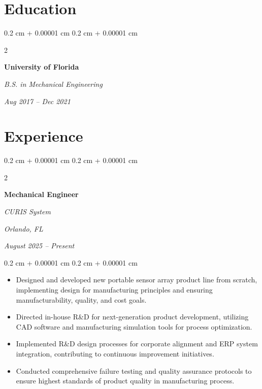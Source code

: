 \documentclass[10pt, letterpaper]{article}
\newenvironment{highlights}{
    \begin{itemize}[
        topsep=0.10 cm,
        parsep=0.10 cm,
        partopsep=0pt,
        itemsep=0pt,
        leftmargin=0.4 cm + 10pt
    ]
}{
    \end{itemize}
} %
\newenvironment{onecolentry}{
    \begin{adjustwidth}{
        0.2 cm + 0.00001 cm
    }{
        0.2 cm + 0.00001 cm
    }
}{
    \end{adjustwidth}
} %
\newenvironment{twocolentry}[2][]{
    \onecolentry
    \def\secondColumn{#2}
    \setcolumnwidth{\fill, 9.0 cm}
    \begin{paracol}{2}
}{
    \switchcolumn \raggedleft \secondColumn
    \end{paracol}
    \endonecolentry
} %
\begin{document}
    \section{Education}

\vspace{0.2 cm}
        
        \begin{twocolentry}{
            
            
        \textit{Aug 2017 – Dec 2021}}
            \textbf{University of Florida}
            
            \textit{B.S. in Mechanical Engineering}
        \end{twocolentry}

        \vspace{0.15 cm}
        

\vspace{0.3 cm}

    
    \section{Experience}

        \vspace{0.2 cm}

        \begin{twocolentry}{
        \textit{Orlando, FL}    
            
        \textit{August 2025 – Present}}
            \textbf{Mechanical Engineer}
            
            \textit{CURIS System}
        \end{twocolentry}

        \vspace{0.10 cm}
        \begin{onecolentry}
            \begin{highlights}
                \item Designed and developed new portable sensor array product line from scratch, implementing design for manufacturing principles and ensuring manufacturability, quality, and cost goals.
                \item Directed in-house R\&D for next-generation product development, utilizing CAD software and manufacturing simulation tools for process optimization.
                \item Implemented R\&D design processes for corporate alignment and ERP system integration, contributing to continuous improvement initiatives.
                \item Conducted comprehensive failure testing and quality assurance protocols to ensure highest standards of product quality in manufacturing process.
            \end{highlights}
        \end{onecolentry}
\end{document}
